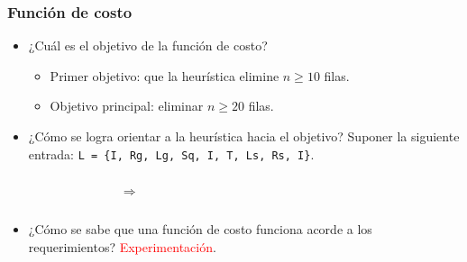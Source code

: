 \begin{frame}
\frametitle{Función de costo}
\begin{itemize}
\item ¿Cuál es el objetivo de la función de costo?
\pause
\begin{itemize}
\item Primer objetivo: que la heurística elimine $n \geq 10$ filas.
\pause
\item Objetivo principal: eliminar $n \geq 20$ filas.
\end{itemize}
\pause
\item ¿Cómo se logra orientar a la heurística hacia el objetivo? 
\pause
Suponer la siguiente entrada: \texttt{L = \{I, Rg, Lg, Sq, 
I, T, Ls, Rs, I\}}.
\begin{columns}
\begin{figure}
\scalebox{.40}{}
\end{figure}
\pause
{}
\begin{center}
$\Longrightarrow$
\end{center}
\begin{figure}
\scalebox{.40}{}
\end{figure}
\end{columns}

\item ¿Cómo se sabe que una función de costo funciona acorde a los requerimientos?
\pause
\textcolor{red}{Experimentación}.
\end{itemize}


\end{frame}

